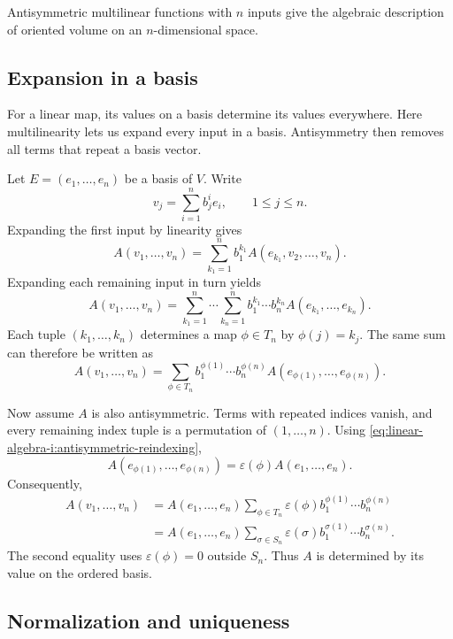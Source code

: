 Antisymmetric multilinear functions with \(n\) inputs give the algebraic
description of oriented volume on an \(n\)-dimensional space.

\subsection{Expansion in a basis}

For a linear map, its values on a basis determine its values everywhere.
Here multilinearity lets us expand every input in a basis. Antisymmetry
then removes all terms that repeat a basis vector.

Let \(E=(e_1,\ldots,e_n)\) be a basis of \(V\). Write
\[
  v_j=\sum_{i=1}^n b^i_j e_i,\qquad 1\leq j\leq n.
\]
Expanding the first input by linearity gives
\[
  A(v_1,\ldots,v_n)=\sum_{k_1=1}^n b^{k_1}_1 A(e_{k_1},v_2,\ldots,v_n).
\]
Expanding each remaining input in turn yields
\begin{equation}
  A(v_1,\ldots,v_n)
    =\sum_{k_1=1}^n\cdots\sum_{k_n=1}^n
      b^{k_1}_1\cdots b^{k_n}_n A(e_{k_1},\ldots,e_{k_n}).
  \label{eq:linear-algebra-i:multilinear-basis-expansion}
\end{equation}
Each tuple \((k_1,\ldots,k_n)\) determines a map \(\phi\in T_n\) by
\(\phi(j)=k_j\). The same sum can therefore be written as
\[
  A(v_1,\ldots,v_n)
    =\sum_{\phi\in T_n}b^{\phi(1)}_1\cdots b^{\phi(n)}_n
      A(e_{\phi(1)},\ldots,e_{\phi(n)}).
\]

Now assume \(A\) is also antisymmetric. Terms with repeated indices
vanish, and every remaining index tuple is a permutation of
\((1,\ldots,n)\). Using
\autoref{eq:linear-algebra-i:antisymmetric-reindexing},
\[
  A(e_{\phi(1)},\ldots,e_{\phi(n)})
    =\varepsilon(\phi)A(e_1,\ldots,e_n).
\]
Consequently,
\begin{equation}
  \begin{aligned}
    A(v_1,\ldots,v_n)
      &=A(e_1,\ldots,e_n)
        \sum_{\phi\in T_n}\varepsilon(\phi)
          b^{\phi(1)}_1\cdots b^{\phi(n)}_n\\
      &=A(e_1,\ldots,e_n)
        \sum_{\sigma\in S_n}\varepsilon(\sigma)
          b^{\sigma(1)}_1\cdots b^{\sigma(n)}_n.
  \end{aligned}
  \label{eq:linear-algebra-i:antisymmetric-basis-expansion}
\end{equation}
The second equality uses \(\varepsilon(\phi)=0\) outside \(S_n\).
Thus \(A\) is determined by its value on the ordered basis.

\subsection{Normalization and uniqueness}

